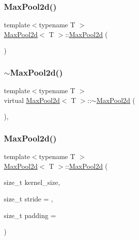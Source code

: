 \subsubsection{\texorpdfstring{MaxPool2d()}{MaxPool2d()}\hspace{0.1cm}{\footnotesize\ttfamily [1/2]}}
{\footnotesize\ttfamily template$<$typename T $>$ \\
\mbox{\hyperlink{class_max_pool2d}{Max\+Pool2d}}$<$ T $>$\+::\mbox{\hyperlink{class_max_pool2d}{Max\+Pool2d}} (\begin{DoxyParamCaption}{ }\end{DoxyParamCaption})\hspace{0.3cm}{\ttfamily [default]}}

\mbox{\label{class_max_pool2d_a826785eceda78b54d150404ef24d23c3}} 
\subsubsection{\texorpdfstring{$\sim$MaxPool2d()}{~MaxPool2d()}}
{\footnotesize\ttfamily template$<$typename T $>$ \\
virtual \mbox{\hyperlink{class_max_pool2d}{Max\+Pool2d}}$<$ T $>$\+::$\sim$\mbox{\hyperlink{class_max_pool2d}{Max\+Pool2d}} (\begin{DoxyParamCaption}{ }\end{DoxyParamCaption})\hspace{0.3cm}{\ttfamily [virtual]}, {\ttfamily [default]}}

\mbox{\label{class_max_pool2d_a5cfd5c6ae11f49fffb3d4a68f261f013}} 
\subsubsection{\texorpdfstring{MaxPool2d()}{MaxPool2d()}\hspace{0.1cm}{\footnotesize\ttfamily [2/2]}}
{\footnotesize\ttfamily template$<$typename T $>$ \\
\mbox{\hyperlink{class_max_pool2d}{Max\+Pool2d}}$<$ T $>$\+::\mbox{\hyperlink{class_max_pool2d}{Max\+Pool2d}} (\begin{DoxyParamCaption}\item[{size\+\_\+t}]{kernel\+\_\+size,  }\item[{size\+\_\+t}]{stride = {},  }\item[{size\+\_\+t}]{padding = {} }\end{DoxyParamCaption})}



